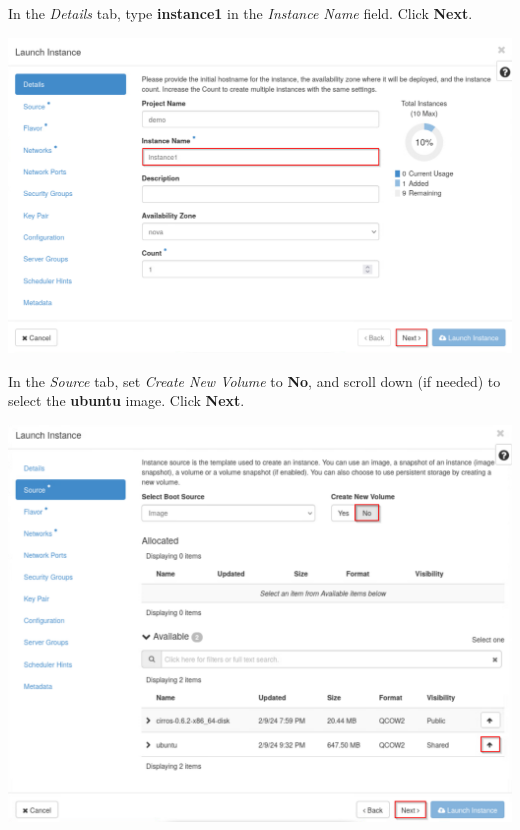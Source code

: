 \documentclass[letterpaper, 12pt]{article}
\begin{document}
\begin{enumerate}
    \begin{labstep}
        In the \textit{Details} tab, type \textbf{instance1} in the \textit{Instance Name} field.
        Click \textbf{Next}.

        \begin{center}
            \includegraphics[width=\linewidth]{images/part8/step7.png}
        \end{center}
    \end{labstep}

    \begin{labstep}
        In the \textit{Source} tab, set \textit{Create New Volume} to \textbf{No}, and scroll down (if needed) to select the \textbf{ubuntu} image.
        Click \textbf{Next}.

        \begin{center}
            \includegraphics[width=\linewidth]{images/part8/step8.png}
        \end{center}
    \end{labstep}


\end{enumerate}
\end{document}
